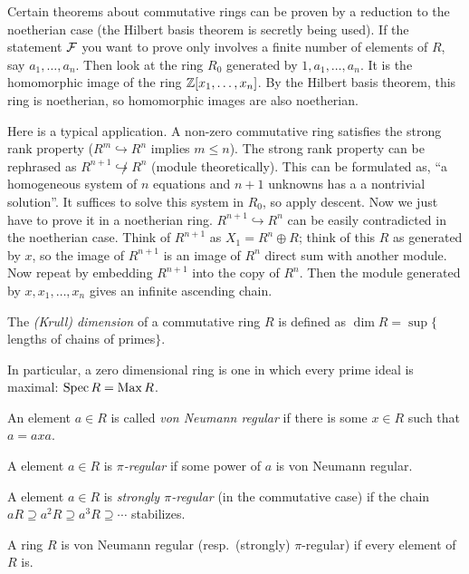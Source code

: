  \setcounter{lecture}{7}


 Certain theorems about commutative rings can be proven by a reduction to the noetherian
 case (the Hilbert basis theorem is secretly being used). If the statement $\mathcal{F}$ you want
 to prove only involves a finite number of elements of $R$, say $a_1,\dots, a_n$. Then
 look at the ring $R_0$ generated by $1, a_1,\dots, a_n$. It is the homomorphic image of
 the ring $\mathbb{Z}[x_1,\dots, x_n]$. By the Hilbert basis theorem, this ring is noetherian,
 so homomorphic images are also noetherian.

 Here is a typical application. A non-zero commutative ring satisfies the strong rank
 property ($R^m\hookrightarrow R^n$ implies $m\le n$). The strong rank property can be
 rephrased as $R^{n+1}\not\hookrightarrow R^n$ (module theoretically). This can be
 formulated as, ``a homogeneous system of $n$ equations and $n+1$ unknowns has a a
 nontrivial solution''. It suffices to solve this system in $R_0$, so apply descent. Now
 we just have to prove it in a noetherian ring. $R^{n+1}\hookrightarrow R^n$ can be
 easily contradicted in the noetherian case. Think of $R^{n+1}$ as $X_1=R^n\oplus R$;
 think of this $R$ as generated by $x$, so the image of $R^{n+1}$ is an image of $R^n$
 direct sum with another module. Now repeat by embedding $R^{n+1}$ into the copy of
 $R^n$. Then the module generated by $x,x_1,\dots, x_n$ gives an infinite ascending
 chain.


 \begin{definition}
   The \emph{(Krull) dimension} of a commutative ring $R$ is defined as $\dim R =
   \sup\{$lengths of chains of primes$\}$.
 \end{definition}
 In particular, a zero dimensional ring is one in which every prime ideal is maximal:
 $\operatorname{Spec} R=\operatorname{Max} R$.

 \begin{definition}
   An element $a\in R$ is called \emph{von Neumann regular} if there is some $x\in R$
   such that $a=axa$.
 \end{definition}
 \begin{definition}[McCoy]
   A element $a\in R$ is \emph{$\pi$-regular} if some power of $a$ is von Neumann
   regular.
 \end{definition}
 \begin{definition}
   A element $a\in R$ is \emph{strongly $\pi$-regular} (in the commutative case)
   if the chain $aR\supseteq a^2R\supseteq a^3R\supseteq \cdots$ stabilizes.
 \end{definition}
 A ring $R$ is von Neumann regular (resp.\ (strongly) $\pi$-regular) if every element of
 $R$ is.

